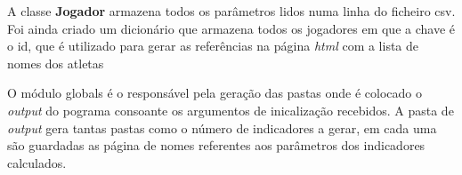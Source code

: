 A classe \textbf{Jogador} armazena todos os parâmetros lidos numa linha do ficheiro csv. Foi ainda criado um dicionário
que armazena todos os jogadores em que a chave é o id, que é utilizado para gerar as referências na página \textit{html} com 
a lista de nomes dos atletas

O módulo globals é o responsável pela geração das pastas onde é colocado o \textit{output} do pograma
consoante os argumentos de inicalização recebidos. A pasta de \textit{output} gera tantas pastas como 
o número de indicadores a gerar, em cada uma são guardadas as página de nomes referentes aos parâmetros
dos indicadores calculados.

